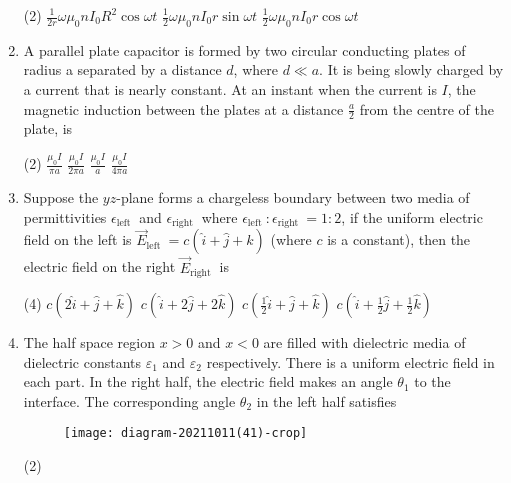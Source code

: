 \begin{enumerate}
	{}
	\begin{tasks}(2)
		\task[\textbf{b.}]$\frac{1}{2 r} \omega \mu_{0} n I_{0} R^{2} \cos \omega t$
		\task[\textbf{c.}]$\frac{1}{2} \omega \mu_{0} n I_{0} r \sin \omega t$
		\task[\textbf{d.}]  $\frac{1}{2} \omega \mu_{0} n I_{0} r \cos \omega t$
	\end{tasks}	
	\item A parallel plate capacitor is formed by two circular conducting plates of radius a separated by a distance $d$, where $d \ll a$. It is being slowly charged by a current that is nearly constant. At an instant when the current is $I$, the magnetic induction between the plates at a distance $\frac{a}{2}$ from the centre of the plate, is
	{}	
	\begin{tasks}(2)
		\task[\textbf{a.}]$\frac{\mu_{0} I}{\pi a}$
		\task[\textbf{b.}]$\frac{\mu_{0} I}{2 \pi a}$
		\task[\textbf{c.}]$\frac{\mu_{0} I}{a}$
		\task[\textbf{d.}]  $\frac{\mu_{0} I}{4 \pi a}$
	\end{tasks}	
	\item Suppose the $y z$-plane forms a chargeless boundary between two media of permittivities $\epsilon_{\text {left }}$ and $\epsilon_{\text {right }}$ where $\epsilon_{\text {left }}: \epsilon_{\text {right }}=1: 2$, if the uniform electric field on the left is $\vec{E}_{\text {left }}=c(\hat{i}+\hat{j}+\hat{k})$ (where $c$ is a constant), then the electric field on the right $\vec{E}_{\text {right }}$ is
	{}
	\begin{tasks}(4)
		\task[\textbf{A.}]  $c(2 \hat{i}+\hat{j}+\hat{k})$
		\task[\textbf{B.}] $c(\hat{i}+2 \hat{j}+2 \hat{k})$
		\task[\textbf{C.}] $c\left(\frac{1}{2} \hat{i}+\hat{j}+\hat{k}\right)$
		\task[\textbf{D.}] $c\left(\hat{i}+\frac{1}{2} \hat{j}+\frac{1}{2} \hat{k}\right)$
	\end{tasks}
	\item  The half space region $x>0$ and $x<0$ are filled with dielectric media of dielectric constants $\varepsilon_{1}$ and $\varepsilon_{2}$ respectively. There is a uniform electric field in each part. In the right half, the electric field makes an angle $\theta_{1}$ to the interface. The corresponding angle $\theta_{2}$ in the left half satisfies
	{{}}
	\begin{figure}[H]
		\centering
		\texttt{[image: diagram-20211011(41)-crop]}
	\end{figure}
	\begin{tasks}(2)

\end{tasks}
\end{enumerate}
